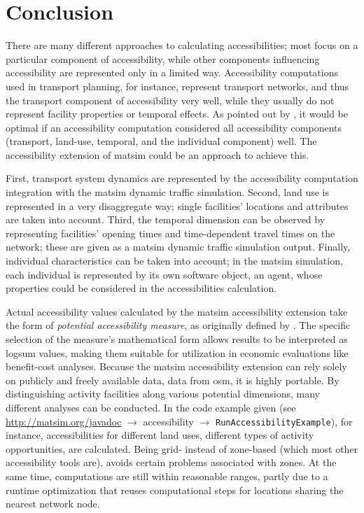 \section{Conclusion}
There are many different approaches to calculating accessibilities; most focus
on a particular component of accessibility, while other components influencing accessibility are 
represented only in a limited way. Accessibility computations used in transport planning, for instance, represent 
transport networks, and thus the transport component of accessibility very well, while they usually do not represent
facility properties or temporal effects. As pointed out by \citet{Geurs2004AccessibilityReview}, it
would be optimal if an accessibility computation considered all accessibility components (\ie transport, 
land-use, temporal, and the individual component) well. The accessibility extension of \gls{matsim} could 
be an approach to achieve this. 

First, transport system dynamics are represented by the accessibility computation integration   
 with the \gls{matsim} dynamic traffic simulation. Second, land use is represented in a very
disaggregate way; single facilities' locations and attributes are taken into account.
Third, the temporal dimension can be observed by representing facilities' opening times and time-dependent
travel times on the network; these are given as a \gls{matsim} dynamic traffic simulation output.
Finally, individual characteristics can be taken into account; in the \gls{matsim}
simulation, each individual is represented by its own software object, \ie an agent, whose properties could be
considered in the accessibilities calculation.

Actual accessibility values calculated by the \gls{matsim} accessibility extension take the form of 
\emph{potential accessibility measure}, as originally defined by \citet{Hansen1959HowAccessibilityShapesLandUse}.
 The specific selection of the measure's mathematical form allows results to be interpreted as 
\gls{logsum} values, making them suitable for utilization in economic evaluations like benefit-cost analyses.
Because the \gls{matsim} accessibility extension can rely solely on publicly and freely available 
data, \eg data from \gls{osm}, it is highly portable. By distinguishing activity facilities 
along various potential dimensions, many different analyses can be conducted. In the code example given
(see \url{http://matsim.org/javadoc} $\to$ accessibility $\to$ \lstinline{RunAccessibilityExample}), for instance,
accessibilities for different land uses, \ie different types of activity opportunities, are calculated.
Being grid- instead of zone-based (which most other accessibility tools are), avoids certain problems associated with 
zones. At the same time, computations are still within reasonable ranges,
partly due to a runtime optimization that reuses computational steps for locations 
sharing the nearest network node.


